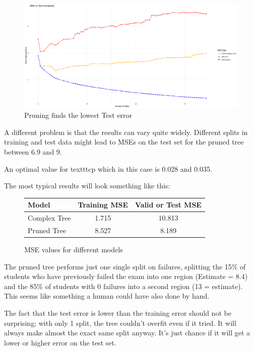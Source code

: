 \documentclass[12pt]{article}
\begin{document}
\begin{figure}
    \centering
    \includegraphics[scale=0.30]{triple_pruning_plot.pdf}
    \caption{Pruning finds the lowest Test error}
\end{figure}

A different problem is that the results can vary quite widely. Different splits in training and test data might lead to MSEs on the test set for the pruned tree between 6.9 and 9.

An optimal value for texttt{cp} which in this case is 0.028 and 0.035.


The most typical results will look something like this:

\begin{figure}
    \centering
    \begin{tabular}{| l | c | c |}
        \hline
        Model        & Training MSE & Valid or Test MSE \\
        \hline
        Complex Tree & 1.715        & 10.813            \\
        Pruned Tree  & 8.527        & 8.189             \\
        \hline
    \end{tabular}
    \caption{MSE values for different models}
\end{figure}

The pruned tree performs just one single split on failures, splitting the 15\% of students who have previously failed the exam into one region (Estimate = 8.4) and the 85\% of students with 0 failures into a second region (13 = estimate). This seems like something a human could have also done by hand.

The fact that the test error is lower than the training error should not be surprising; with only 1 split, the tree couldn't overfit even if it tried. It will always make almost the exact same split anyway. It's just chance if it will get a lower or higher error on the test set.
\end{document}

